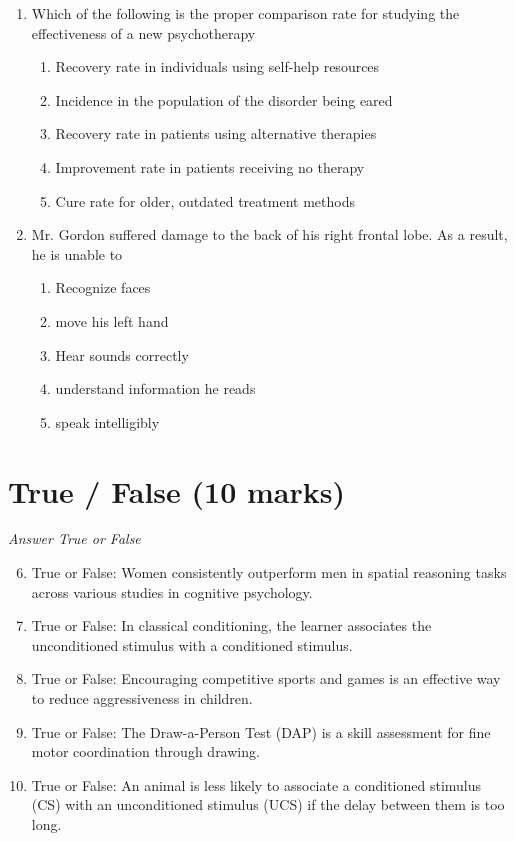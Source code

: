 \documentclass[12pt]{article}
\begin{document}
\begin{enumerate}[label=\arabic*.]
\item Which of the following is the proper comparison rate for studying the effectiveness of a new psychotherapy
\begin{enumerate}[label=(\alph*)]
    \item Recovery rate in individuals using self-help resources
    \item Incidence in the population of the disorder being eared
    \item Recovery rate in patients using alternative therapies
    \item Improvement rate in patients receiving no therapy
    \item Cure rate for older, outdated treatment methods
\end{enumerate}
\item Mr. Gordon suffered damage to the back of his right frontal lobe. As a result, he is unable to
\begin{enumerate}[label=(\alph*)]
    \item Recognize faces
    \item move his left hand
    \item Hear sounds correctly
    \item understand information he reads
    \item speak intelligibly
\end{enumerate}
\end{enumerate}

\section*{True / False (10 marks)}
\textit{Answer True or False}
\begin{enumerate}[label=\arabic*.]
\setcounter{enumi}{5}
\item True or False: Women consistently outperform men in spatial reasoning tasks across various studies in cognitive psychology.
\item True or False: In classical conditioning, the learner associates the unconditioned stimulus with a conditioned stimulus.
\item True or False: Encouraging competitive sports and games is an effective way to reduce aggressiveness in children.
\item True or False: The Draw-a-Person Test (DAP) is a skill assessment for fine motor coordination through drawing.
\item True or False: An animal is less likely to associate a conditioned stimulus (CS) with an unconditioned stimulus (UCS) if the delay between them is too long.
\end{enumerate}
\end{document}
